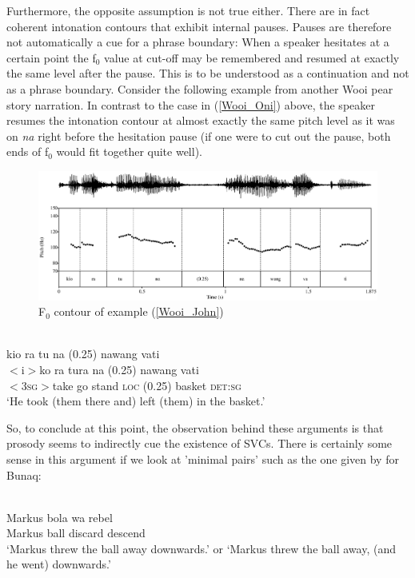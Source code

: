 Furthermore, the opposite assumption is not true either. There are in fact coherent intonation contours that exhibit internal pauses. Pauses are therefore not automatically a cue for a phrase boundary: When a speaker hesitates at a certain point the f$_0$ value at cut-off may be remembered and resumed at exactly the same level after the pause. This is to be understood as a continuation and not as a phrase boundary. Consider the following example from another Wooi pear story narration. In contrast to the case in (\ref{Wooi_Oni}) above, the speaker resumes the intonation contour at almost exactly the same pitch level as it was on \textit{na} right before the hesitation pause (if one were to cut out the pause, both ends of f$_0$ would fit together quite well).

\begin{figure}
\includegraphics[width=\textwidth]{figures/pearJohnHESIT.eps} 
\caption{F$_0$ contour of example (\ref{Wooi_John})}\label{fig:Wooi_John}
\end{figure}

\ea \label{Wooi_John}
\\
\glll kio ra tu na (0.25) nawang vati \\
$<$i$>$ko ra tura na (0.25) nawang vati \\
$<$3\textsc{sg}$>$take go stand \textsc{loc} (0.25) basket \textsc{det}:\textsc{sg} \\
\glft `He took (them there and) left (them) in the basket.' \\ 
\z

So, to conclude at this point, the observation behind these arguments is that prosody seems to indirectly cue the existence of SVCs. There is certainly some sense in this argument if we look at 'minimal pairs' such as the one given by \citet{schapper2009bunaq} for Bunaq:

\ea \label{bunaq2}
\\
\gll Markus bola wa rebel \\
Markus ball discard descend \\
\glft `Markus threw the ball away downwards.’ or `Markus threw the ball away, (and he went) downwards.’\\ 
\z

